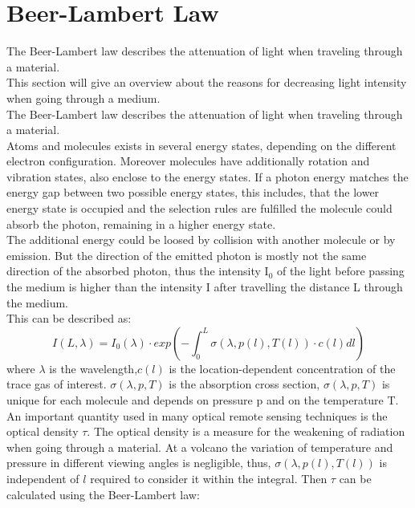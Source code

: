 \documentclass  [
  paper    = a4,
  BCOR     = 10mm,
  twoside,
  fontsize = 12pt,
  fleqn,
  toc      = bibnumbered,
  toc      = listofnumbered,
  numbers  = noendperiod,
  headings = normal,
  listof   = leveldown,
  version  = 3.03
]                                       {scrreprt}
\begin{document}
\section*{Beer-Lambert Law}
The Beer-Lambert law describes the attenuation of light when traveling through a material.\\
This section will give an overview about the reasons for decreasing light intensity when going through a medium.\\
The Beer-Lambert law describes the attenuation of light when traveling through a material.\\
%
Atoms and molecules exists in several energy states, depending on the different electron configuration. Moreover molecules have additionally rotation and vibration states, also enclose to the energy states. If a photon energy matches the energy gap between two possible energy states, this includes, that the lower energy state is occupied and the selection rules are fulfilled  the molecule could absorb the photon, remaining in a higher energy state.\\
The additional energy could be loosed by collision with another molecule or by emission. But the direction of the emitted photon is mostly not the same direction of the absorbed photon, thus the intensity I$_{0}$ of the light before passing the medium is higher than the intensity I after travelling the distance L through the medium.\\
This can be described as:\\ 
\begin{equation}
I\left(L,\lambda\right) = I_{0}\left(\lambda\right)\cdot exp\left(-\int^{L}_{0}\sigma\left(\lambda,p(l),T(l)\right)\cdot c\left(l\right)dl\right)
\end{equation}
where $\lambda$ is the wavelength,$c\left(l\right)$ is the location-dependent concentration of the trace gas of interest. $\sigma\left(\lambda,p,T\right)$ is the absorption cross section, $\sigma\left(\lambda,p,T\right)$ is unique for each molecule and depends on pressure p and on the temperature T.\\
%
An important quantity used in many optical remote sensing techniques is the optical density $\tau$. The optical density is a measure for the weakening of radiation when going through a material. At a volcano the variation of temperature and pressure in different viewing angles is negligible, thus, $\sigma\left(\lambda,p(l),T(l)\right)$ is independent of $l$ required to consider it within the integral. Then  $\tau$ can be calculated using the Beer-Lambert law:
\end{document}
